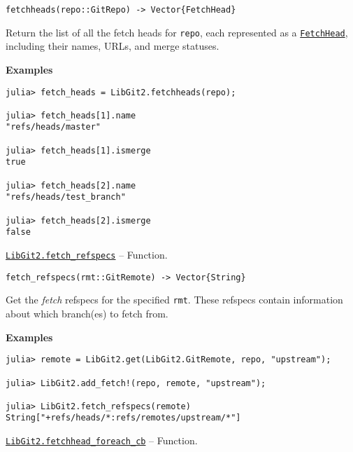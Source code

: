 \begin{adjustwidth}{2em}{0pt}


\begin{verbatim}
fetchheads(repo::GitRepo) -> Vector{FetchHead}
\end{verbatim}

Return the list of all the fetch heads for \texttt{repo}, each represented as a \hyperlink{17806809481919147110}{\texttt{FetchHead}}, including their names, URLs, and merge statuses.

\textbf{Examples}


\begin{verbatim}
julia> fetch_heads = LibGit2.fetchheads(repo);

julia> fetch_heads[1].name
"refs/heads/master"

julia> fetch_heads[1].ismerge
true

julia> fetch_heads[2].name
"refs/heads/test_branch"

julia> fetch_heads[2].ismerge
false
\end{verbatim}



\end{adjustwidth}
\hypertarget{2305079754843803490}{} 
\hyperlink{2305079754843803490}{\texttt{LibGit2.fetch\_refspecs}}  -- {Function.}

\begin{adjustwidth}{2em}{0pt}


\begin{verbatim}
fetch_refspecs(rmt::GitRemote) -> Vector{String}
\end{verbatim}

Get the \emph{fetch} refspecs for the specified \texttt{rmt}. These refspecs contain information about which branch(es) to fetch from.

\textbf{Examples}


\begin{verbatim}
julia> remote = LibGit2.get(LibGit2.GitRemote, repo, "upstream");

julia> LibGit2.add_fetch!(repo, remote, "upstream");

julia> LibGit2.fetch_refspecs(remote)
String["+refs/heads/*:refs/remotes/upstream/*"]
\end{verbatim}



\end{adjustwidth}
\hypertarget{14433606895966923953}{} 
\hyperlink{14433606895966923953}{\texttt{LibGit2.fetchhead\_foreach\_cb}}  -- {Function.}

